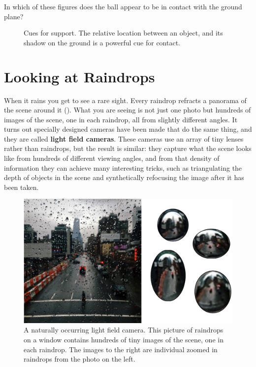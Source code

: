 In which of these figures does the ball appear to be in contact with the ground plane?

\begin{figure}[h!]
\centerline{
    }
  \centerline{
    }
    \caption{Cues for support. The relative location between an object, and its shadow on the ground is a powerful cue for contact.}
    \label{fig:cues_for_suppport}
\end{figure}


\section{Looking at Raindrops}

When it rains you get to see a rare sight. Every raindrop refracts a panorama of the scene around it (\fig{\ref{fig:droplets}}). What you are seeing is not just one photo but hundreds of images of the scene, one in each raindrop, all from slightly different angles. It turns out specially designed cameras have been made that do the same thing, and they are called {\bf light field cameras}.
These cameras use an array of tiny lenses rather than raindrops, but the result is similar: they capture what the scene looks like from hundreds of different viewing angles, and from that density of information they can achieve many interesting tricks, such as triangulating the depth of objects in the scene and synthetically refocusing the image after it has been taken.

\begin{figure}[t]
\centerline{
    \includegraphics[width=1.0\linewidth]{figures/visionscience/droplets.jpg}}
    \caption{A naturally occurring light field camera. This picture of raindrops on a window contains hundreds of tiny images of the scene, one in each raindrop. The images to the right are individual zoomed in raindrops from the photo on the left.}
    \label{fig:droplets}
\end{figure}


